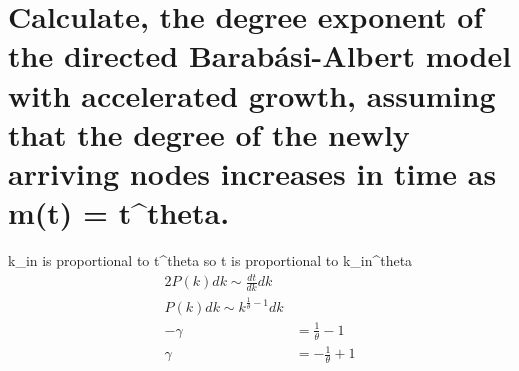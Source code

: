 \documentclass{article}%
\begin{document}
%
\normalsize%
\section{Calculate, the degree exponent of the directed Barabási{-}Albert model with accelerated growth, assuming that the degree of the newly arriving nodes increases in time as m(t) = t\^{}theta.}%
\label{sec:Calculate,thedegreeexponentofthedirectedBarabsi{-}Albertmodelwithacceleratedgrowth,assumingthatthedegreeofthenewlyarrivingnodesincreasesintimeasm(t)=ttheta.}%
k\_in is proportional to t\^{}theta so t is proportional to k\_in\^{}theta%
\begin{alignat*}{2}%
P(k)dk\sim\frac{dt}{dk}dk\\%
P(k)dk\sim k^{\frac{1}{\theta}-1}dk\\%
-\gamma&=\frac{1}{\theta}-1\\%
\gamma&=-\frac{1}{\theta}+1\\%
\end{alignat*}

%
\end{document}
